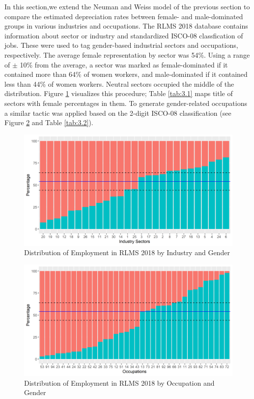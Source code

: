 \documentclass[12pt,a4paper]{article}
\numberwithin{equation}{section}
\begin{document}
In this section,we extend the Neuman and Weiss model of the previous section to compare the estimated depreciation rates between female- and male-dominated groups in various industries and occupations. The RLMS 2018 database contains information about sector or industry and standardized ISCO-08 classfication of jobs. These were used  to tag gender-based industrial sectors and occupations, respectively. The average female representation by sector was 54\%.  Using a range of $\pm$ 10\% from the average, a sector was marked as female-dominated if it contained more than 64\% of women workers, and male-dominated if it contained less than 44\% of women workers. Neutral sectors occupied the middle of the distribution. Figure \ref{fig:3.1} visualizes this procedure; Table \ref{tab:3.1} maps title of sectors with female percentages in them. To generate gender-related occupations a similar tactic was applied based on the 2-digit ISCO-08 classification (see Figure \ref{fig:3.2} and Table \ref{tab:3.2}). 

\begin{figure}[H]
	\centering
	\includegraphics{gen_ind18.png}
	\caption{Distribution of Employment in RLMS 2018 by Industry and Gender}\label{fig:3.1}
\end{figure}

\begin{figure}[H]
	\centering
	\includegraphics{gen_occ18.png}
	\caption{Distribution of Employment in RLMS 2018 by Occupation and Gender}\label{fig:3.2}
\end{figure}
	
\end{document}
